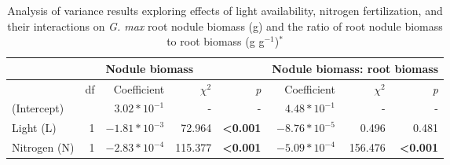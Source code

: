 \newpage
\begin{landscape}
\begin{table}
    \caption[Analysis of variance results exploring effects of light availability, nitrogen fertilization, and their interactions on \textit{G. max} root nodule biomass and the ratio of root nodule biomass to root biomass]{Analysis of variance results exploring effects of light availability, nitrogen fertilization, and their interactions on \textit{G. max} root nodule biomass (g) and the ratio of root nodule biomass to root biomass (g g$^{-1}$)$^*$}
    \centering
    \begin{tabular}{p{2.4cm}p{0.5cm}p{2cm}p{1.5cm}p{1.5cm}p{2cm}p{1.5cm}p{1.5cm}}
        && 
        \multicolumn{3}{l}{Nodule biomass} 
        & \multicolumn{3}{l}{Nodule biomass: root biomass} 
        \\
        \hline
        & \multicolumn{1}{r}{df}
        & \multicolumn{1}{r}{Coefficient}   & \multicolumn{1}{r}{$\chi^{2}$}        & \multicolumn{1}{r}{\textit{p}}
        & \multicolumn{1}{r}{Coefficient}   & \multicolumn{1}{r}{$\chi^{2}$}        & \multicolumn{1}{r}{\textit{p}}
        \\
        \hline
        
        (Intercept)
        && \multicolumn{1}{r}{$3.02*10^{-1}$}        & \multicolumn{1}{r}{-}                 & \multicolumn{1}{r}{-}
        & \multicolumn{1}{r}{$4.48*10^{-1}$}         & \multicolumn{1}{r}{-}                 & \multicolumn{1}{r}{-} 
        \\
    
        Light (L) & \multicolumn{1}{r}{1}
        & \multicolumn{1}{r}{$-1.81*10^{-3}$}     & \multicolumn{1}{r}{72.964}            & \multicolumn{1}{r}{\textbf{<0.001}}
        & \multicolumn{1}{r}{$-8.76*10^{-5}$}     & \multicolumn{1}{r}{0.496}             & \multicolumn{1}{r}{0.481} 
        \\
    
        Nitrogen (N) & \multicolumn{1}{r}{1}
        & \multicolumn{1}{r}{$-2.83*10^{-4}$}     & \multicolumn{1}{r}{115.377}           & \multicolumn{1}{r}{\textbf{<0.001}}
        & \multicolumn{1}{r}{$-5.09*10^{-4}$}     & \multicolumn{1}{r}{156.476}           & \multicolumn{1}{r}{\textbf{<0.001}} 
        \\
    

\end{tabular}
\end{table}
\end{landscape}
